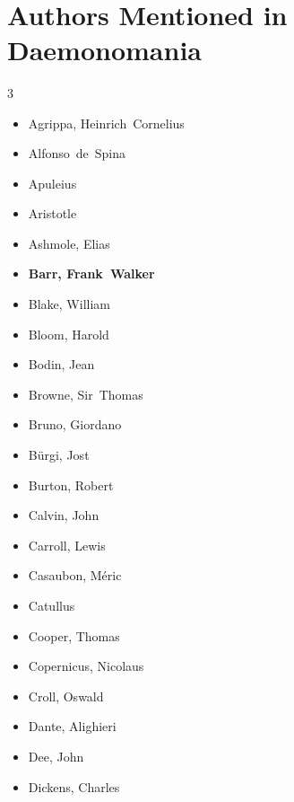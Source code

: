\documentclass[10pt,makeidx]{extreport}
\newcommand\fleuron{\begin{turn}{45}\Large \ding{166}\end{turn}}
\newcommand\doublefleuron{%
	\reflectbox{\fleuron}\AC\staveXLIX\reflectbox{\AC}\fleuron}
\newcommand\fleuronbar{%
	{\huge\LinearACCCXIII}\xrfill[1.3ex]{1pt}\doublefleuron\xrfill[1.3ex]{1pt}\reflectbox{\huge\LinearACCCXIII}}
\newcommand\nbvspace[1][3]{\vspace*{\stretch{#1}}}
\begin{document}
\bigskip
\begin{center}
\vfill
\shadowoffset{1pt}
\shadowtext{%
{\color{Mahogany}\fontsize{60}{64}\Mars}}\\
\nbvspace[1]
\end{center}

\pagebreak
\section{Authors Mentioned in Daemonomania}

\begin{multicols}{3}
\begin{itemize}
  \item Agrippa, Heinrich~Cornelius
  \item Alfonso~de~Spina
  \item Apuleius
  \item Aristotle
  \item Ashmole, Elias
  \item \textbf{Barr, Frank~Walker}
  \item Blake, William
  \item Bloom, Harold
  \item Bodin, Jean
  \item Browne, Sir~Thomas
  \item Bruno, Giordano
  \item Bürgi, Jost
  \item Burton, Robert
  \item Calvin, John
  \item Carroll, Lewis
  \item Casaubon, Méric
  \item Catullus
  \item Cooper, Thomas
  \item Copernicus, Nicolaus
  \item Croll, Oswald
  \item Dante, Alighieri
  \item Dee, John
  \item Dickens, Charles

\end{itemize}
\end{multicols}
\end{document}
